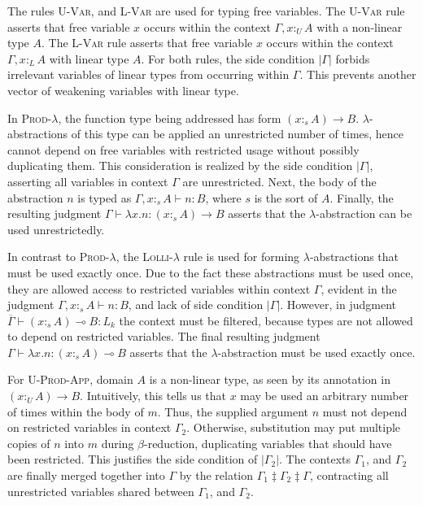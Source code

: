 \documentclass[sigplan,screen,review,authordraft]{acmart}
\theoremstyle{definition}
\newcommand{\rname}[1]{\textsc{\footnotesize #1}}
\newcommand{\pure}[1]{|#1|}
\newcommand{\utype}{:_{\scriptscriptstyle U}}
\newcommand{\ltype}{:_{\scriptscriptstyle L}}
\newcommand{\stype}[1]{:_#1}
\newcommand{\mrg}[3]{#1\ddagger#2\ddagger#3}
\begin{document}
  The rules \rname{U-Var}, and \rname{L-Var} are used for typing free variables. The \rname{U-Var} rule asserts that free variable $x$ occurs within the context $\Gamma, x \utype A$ with a non-linear type $A$. The \rname{L-Var} rule asserts that free variable $x$ occurs within the context $\Gamma, x \ltype A$ with linear type $A$. For both rules, the side condition $\pure{\Gamma}$ forbids irrelevant variables of linear types from occurring within $\Gamma$. This prevents another vector of weakening variables with linear type.

  In \rname{Prod-$\lambda$}, the function type being addressed has form $(x \stype{s} A) \rightarrow B$. $\lambda$-abstractions of this type can be applied an unrestricted number of times, hence cannot depend on free variables with restricted usage without possibly duplicating them. This consideration is realized by the side condition $\pure{\Gamma}$, asserting all variables in context $\Gamma$ are unrestricted. Next, the body of the abstraction $n$ is typed as $\Gamma, x \stype{s} A \vdash n : B$, where $s$ is the sort of $A$. Finally, the resulting judgment $\Gamma \vdash \lambda x.n : (x \stype{s} A) \rightarrow B$ asserts that the $\lambda$-abstraction can be used unrestrictedly.

  In contrast to \rname{Prod-$\lambda$}, the \rname{Lolli-$\lambda$} rule is used for forming $\lambda$-abstractions that must be used exactly once. Due to the fact these abstractions must be used once, they are allowed access to restricted variables within context $\Gamma$, evident in the judgment $\Gamma, x \stype{s} A \vdash n : B$, and lack of side condition $\pure{\Gamma}$. However, in judgment $\overline{\Gamma} \vdash (x \stype{s} A) \multimap B : L_k$ the context must be filtered, because types are not allowed to depend on restricted variables. The final resulting judgment $\Gamma \vdash \lambda x.n : (x \stype{s} A) \multimap B$ asserts that the $\lambda$-abstraction must be used exactly once.
  
  For \rname{U-Prod-App}, domain $A$ is a non-linear type, as seen by its annotation in $(x \utype A) \rightarrow B$. Intuitively, this tells us that $x$ may be used an arbitrary number of times within the body of $m$. Thus, the supplied argument $n$ must not depend on restricted variables in context $\Gamma_2$. Otherwise, substitution may put multiple copies of $n$ into $m$ during $\beta$-reduction, duplicating variables that should have been restricted. This justifies the side condition of $\pure{\Gamma_2}$. The contexts $\Gamma_1$, and $\Gamma_2$ are finally merged together into $\Gamma$ by the relation $\mrg{\Gamma_1}{\Gamma_2}{\Gamma}$, contracting all unrestricted variables shared between $\Gamma_1$, and $\Gamma_2$.
  
\end{document}
